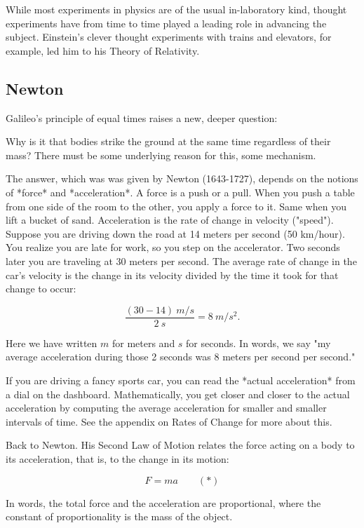 While most experiments in physics are of the usual in-laboratory kind, thought experiments have from time to time played a leading role in advancing the subject. Einstein's clever thought experiments with trains and elevators, for example, led him to his Theory of Relativity.



\subsection{Newton}

Galileo's principle of equal times raises a new, deeper question: 

Why is it that bodies strike the ground at the same time regardless of their mass?  There must be some underlying reason for this, some mechanism.


The answer, which was was given by Newton (1643-1727), depends on the notions of *force* and *acceleration*.  A force is a push or a pull.  When you push a table from one side of the room to the other, you apply a force to it. Same when you lift a bucket of sand.  Acceleration is the rate of change in velocity ("speed").  Suppose you are driving down the road at 14 meters per second (50 km/hour).  You realize you are late for work, so you step on the accelerator.  Two seconds later you are traveling at 30 meters per second.  The average rate of change in the car's velocity is the change in its velocity divided by the time it took for that change to occur:

$$
\frac{(30 - 14) \ m/s}{2\ s} = 8\  m/s^2.
$$

Here we have written $m$ for meters and $s$ for seconds.   In words, we say "my average acceleration during those 2 seconds was 8 meters per second per second."  

If you are driving a fancy sports car, you can read the *actual acceleration* from a dial on the dashboard.  Mathematically, you get closer and closer to the actual acceleration by computing the average acceleration for smaller and smaller intervals of time.  See the appendix on Rates of Change for more about this.

Back to Newton.  His Second Law of Motion relates the force acting on a body to its acceleration, that is, to the change in its motion:

$$
F = ma \qquad (*)
$$

In words, the total force and the acceleration are proportional, where the constant of proportionality is the mass of the object. 

